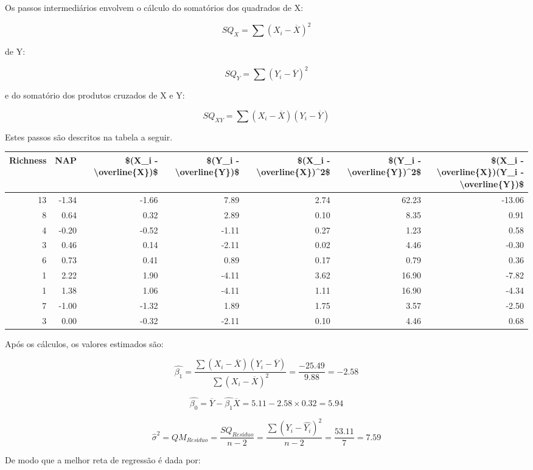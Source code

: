 \documentclass[
]{book}
\begin{document}
Os passos intermediários envolvem o cálculo do somatórios dos quadrados de X:

\[SQ_X = \sum{(X_i - \overline{X})^2}\]

de Y:

\[SQ_Y = \sum{(Y_i - \overline{Y})^2}\]

e do somatório dos produtos cruzados de X e Y:

\[SQ_{XY} = \sum{(X_i - \overline{X}) (Y_i - \overline{Y})}\]

Estes passos são descritos na tabela a seguir.

\begin{tabular}{r|r|r|r|r|r|r}
\hline
Richness & NAP & \$(X\_i - \textbackslash{}overline\{X\})\$ & \$(Y\_i - \textbackslash{}overline\{Y\})\$ & \$(X\_i - \textbackslash{}overline\{X\})\textasciicircum{}2\$ & \$(Y\_i - \textbackslash{}overline\{Y\})\textasciicircum{}2\$ & \$(X\_i - \textbackslash{}overline\{X\})(Y\_i - \textbackslash{}overline\{Y\})\$\\
\hline
13 & -1.34 & -1.66 & 7.89 & 2.74 & 62.23 & -13.06\\
\hline
8 & 0.64 & 0.32 & 2.89 & 0.10 & 8.35 & 0.91\\
\hline
4 & -0.20 & -0.52 & -1.11 & 0.27 & 1.23 & 0.58\\
\hline
3 & 0.46 & 0.14 & -2.11 & 0.02 & 4.46 & -0.30\\
\hline
6 & 0.73 & 0.41 & 0.89 & 0.17 & 0.79 & 0.36\\
\hline
1 & 2.22 & 1.90 & -4.11 & 3.62 & 16.90 & -7.82\\
\hline
1 & 1.38 & 1.06 & -4.11 & 1.11 & 16.90 & -4.34\\
\hline
7 & -1.00 & -1.32 & 1.89 & 1.75 & 3.57 & -2.50\\
\hline
3 & 0.00 & -0.32 & -2.11 & 0.10 & 4.46 & 0.68\\
\hline
\end{tabular}

Após os cálculos, os valores estimados são:

\[\hat{\beta_1} = \frac{\sum{(X_i - \overline{X})(Y_i - \overline{Y})}}{\sum{(X_i - \overline{X})^2}} = \frac{-25.49}{9.88} = -2.58\]

\[\hat{\beta_0} = \overline{Y} - \hat{\beta_1}\overline{X} = 5.11 -2.58 \times 0.32 = 5.94\]

\[\hat{\sigma}^2 = QM_{Resíduo} = \frac{SQ_{Resíduo}}{n-2} = \frac{\sum{(Y_i-\hat{Y_ i})^2}}{n-2} = \frac{53.11}{7} = 7.59\]

De modo que a melhor reta de regressão é dada por:
\end{document}
